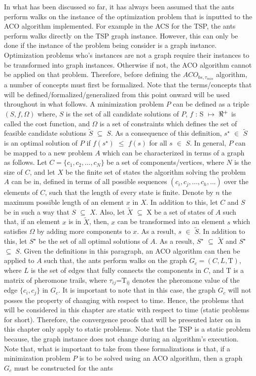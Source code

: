 \documentclass[12pt]{article}
\numberwithin{equation}{subsection}
\numberwithin{table}{subsection}
\numberwithin{algorithm}{subsection}
\numberwithin{figure}{subsection}
\begin{document}
In what has been discussed so far, it has always been assumed that the ants perform walks on the instance of the optimization problem that is inputted to the ACO algorithm implemented. For example in the ACS for the TSP, the ants perform walks directly on the TSP graph instance. However, this can only be done if the instance of the problem being consider is a graph instance. Optimization problems who's instances are not a graph require their instances to be transformed into graph instances. Otherwise if not, the ACO algorithm cannot be applied on that problem. Therefore, before defining the $ACO_{bs, \tau_{min}}$ algorithm, a number of concepts must first be formalized. Note that the terms/concepts that will be defined/formalized/generalized from this point onward will be used throughout in what follows. A minimization problem $P$ can be defined as a triple $(S, f, \Omega)$ where, $S$ is the set of all candidate solutions of $P$, $f$ : S $\mapsto$ $\real^+$ is called the cost function, and $\Omega$ is a set of constraints which defines the set of feasible candidate solutions $\widetilde{S}$ $\subseteq$ $S$. As a consequence of this definition, $s^\star$ $\in$ $\widetilde{S}$ is an optimal solution of $P$ if $f(s^\star)$ $\leq$ $f(s)$ for all $s$ $\in$ $S$. In general, $P$ can be mapped to a new problem $A$ which can be characterized in terms of a graph as follows. Let $C=\{c_1, c_2, ..., c_N\}$ be a set of components/vertices, where $N$ is the size of $C$, and let $X$ be the finite set of states the algorithm solving the problem $A$ can be in, defined in terms of all possible sequences $(c_i, c_j, ..., c_h, ...)$ over the elements of $C$, such that the length of every state is finite. Denote by $n$ the maximum possible length of an element $x$ in $X$. In addition to this, let $C$ and $S$ be in such a way that $S$ $\subseteq$ $X$. Also, let $\widetilde{X}$ $\subseteq$ X be a set of states of $A$ such that, if an element $x$ is in $\widetilde{X}$, then, $x$ can be transformed into an element $s$ which satisfies $\Omega$ by adding more components to $x$. As a result, $s$ $\in$ $\widetilde{S}$. In addition to this, let $S^\star$ be the set of all optimal solutions of $A$. As a result, $S^\star$ $\subseteq$ $\widetilde{X}$ and $S^\star$ $\subseteq$ $S$. Given the definitions in this paragraph, an ACO algorithm can then be applied to $A$ such that, the ants perform walks on the graph $G_c=(C,L,\mathrm{T})$, where $L$ is the set of edges that fully connects the components in $C$, and $\mathrm{T}$ is a matrix of pheromone trails, where $\tau_{ij}$=$\mathrm{T_{ij}}$ denotes the pheromone value of the edge $\{c_i, c_j\}$ in $G_c$. It is important to note that in this case, the graph $G_c$ will not posses the property of changing with respect to time. Hence, the problems that will be considered in this chapter are static with respect to time (static problems for short). Therefore, the convergence proofs that will be presented later on in this chapter only apply to static problems. Note that the TSP is a static problem because, the graph instance does not change during an algorithm's execution. Note that, what is important to take from these formalizations is that, if a minimization problem $P$ is to be solved using an ACO algorithm, then a graph $G_c$ must be constructed for the ants 
\end{document}
